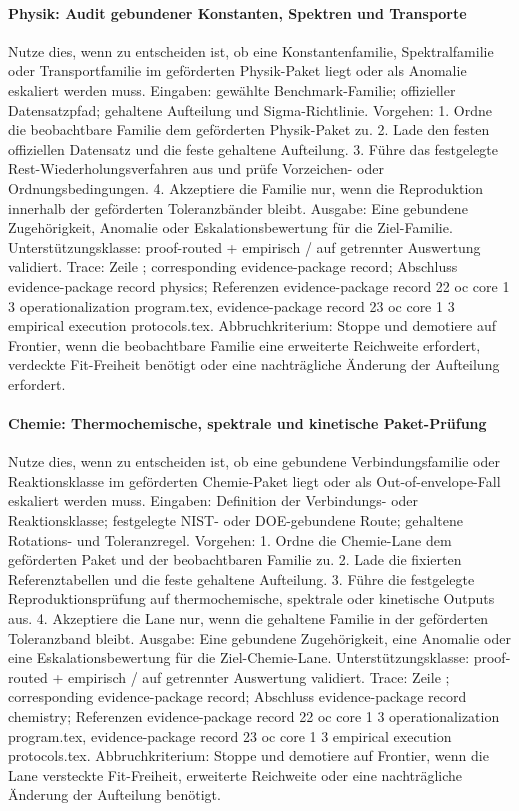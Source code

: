\paragraph{Physik: Audit gebundener Konstanten, Spektren und Transporte}
Nutze dies, wenn zu entscheiden ist, ob eine Konstantenfamilie, Spektralfamilie oder Transportfamilie im geförderten Physik-Paket liegt oder als Anomalie eskaliert werden muss.
Eingaben: gewählte Benchmark-Familie; \allowbreak offizieller Datensatzpfad; \allowbreak gehaltene Aufteilung und Sigma-Richtlinie.
Vorgehen: 1. Ordne die beobachtbare Familie dem geförderten Physik-Paket zu. 2. Lade den festen offiziellen Datensatz und die feste gehaltene Aufteilung. 3. Führe das festgelegte Rest-Wiederholungsverfahren aus und prüfe Vorzeichen- oder Ordnungsbedingungen. 4. Akzeptiere die Familie nur, wenn die Reproduktion innerhalb der geförderten Toleranzbänder bleibt.
Ausgabe: Eine gebundene Zugehörigkeit, Anomalie oder Eskalationsbewertung für die Ziel-Familie.
Unterstützungsklasse: proof-routed + empirisch / auf getrennter Auswertung validiert.
Trace: Zeile ; corresponding evidence-package record; \allowbreak Abschluss evidence-package record physics; \allowbreak Referenzen evidence-package record 22 oc core 1 3 operationalization program.tex, \allowbreak evidence-package record 23 oc core 1 3 empirical execution protocols.tex.
Abbruchkriterium: Stoppe und demotiere auf Frontier, wenn die beobachtbare Familie eine erweiterte Reichweite erfordert, verdeckte Fit-Freiheit benötigt oder eine nachträgliche Änderung der Aufteilung erfordert.

\paragraph{Chemie: Thermochemische, spektrale und kinetische Paket-Prüfung}
Nutze dies, wenn zu entscheiden ist, ob eine gebundene Verbindungsfamilie oder Reaktionsklasse im geförderten Chemie-Paket liegt oder als Out-of-envelope-Fall eskaliert werden muss.
Eingaben: Definition der Verbindungs- oder Reaktionsklasse; \allowbreak festgelegte NIST- oder DOE-gebundene Route; \allowbreak gehaltene Rotations- und Toleranzregel.
Vorgehen: 1. Ordne die Chemie-Lane dem geförderten Paket und der beobachtbaren Familie zu. 2. Lade die fixierten Referenztabellen und die feste gehaltene Aufteilung. 3. Führe die festgelegte Reproduktionsprüfung auf thermochemische, spektrale oder kinetische Outputs aus. 4. Akzeptiere die Lane nur, wenn die gehaltene Familie in der geförderten Toleranzband bleibt.
Ausgabe: Eine gebundene Zugehörigkeit, eine Anomalie oder eine Eskalationsbewertung für die Ziel-Chemie-Lane.
Unterstützungsklasse: proof-routed + empirisch / auf getrennter Auswertung validiert.
Trace: Zeile ; corresponding evidence-package record; \allowbreak Abschluss evidence-package record chemistry; \allowbreak Referenzen evidence-package record 22 oc core 1 3 operationalization program.tex, \allowbreak evidence-package record 23 oc core 1 3 empirical execution protocols.tex.
Abbruchkriterium: Stoppe und demotiere auf Frontier, wenn die Lane versteckte Fit-Freiheit, erweiterte Reichweite oder eine nachträgliche Änderung der Aufteilung benötigt.

